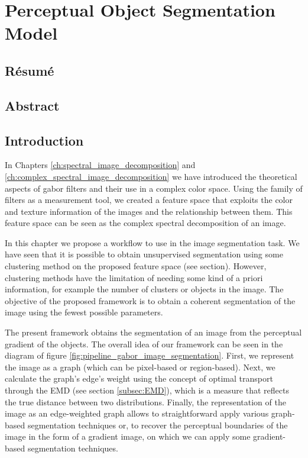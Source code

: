 
\chapter{Perceptual Object Segmentation Model}

\section*{Résumé}
\noindent 

\section*{Abstract}
\noindent 

\section{Introduction}
In Chapters \ref{ch:spectral_image_decomposition} and \ref{ch:complex_spectral_image_decomposition} we have introduced the theoretical aspects of gabor filters and their use in a complex color space. Using the family of filters as a measurement tool, we created a feature space that exploits the color and texture information of the images and the relationship between them. This feature space can be seen as the complex spectral decomposition of an image.

In this chapter we propose a workflow to use in the image segmentation task. We have seen that it is possible to obtain unsupervised segmentation using some clustering method on the proposed feature space (see section). However, clustering methods have the limitation of needing some kind of a priori information, for example the number of clusters or objects in the image. The objective of the proposed framework is to obtain a coherent segmentation of the image using the fewest possible parameters.

The present framework obtains the segmentation of an image from the perceptual gradient of the objects. The overall idea of our framework can be seen in the diagram of figure \ref{fig:pipeline_gabor_image_segmentation}. First, we represent the image as a graph (which can be pixel-based or region-based). Next, we calculate the graph's edge's weight using the concept of optimal transport through the EMD (see section \ref{subsec:EMD}), which is a measure that reflects the true distance between two distributions. Finally, the representation of the image as an edge-weighted graph allows to straightforward apply various graph-based segmentation techniques or, to recover the perceptual boundaries of the image in the form of a gradient image, on which we can apply some gradient-based segmentation techniques.


